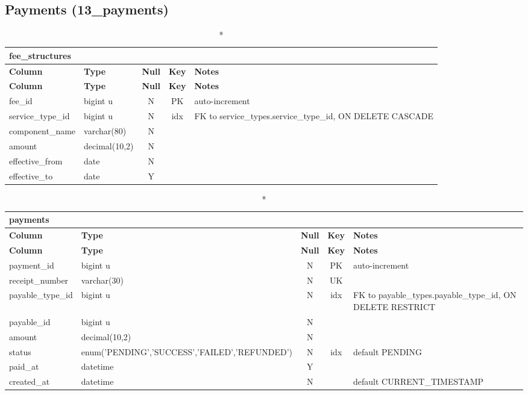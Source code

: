 \subsection*{Payments (13\_payments)}
\begin{longtable}{@{}p{3.4cm}p{2.9cm}c c p{5.6cm}@{}}
\caption*{\textbf{fee\_\allowbreak{}structures}}\\
\toprule \textbf{Column} & \textbf{Type} & \textbf{Null} & \textbf{Key} & \textbf{Notes} \\ \midrule \endfirsthead
\toprule \textbf{Column} & \textbf{Type} & \textbf{Null} & \textbf{Key} & \textbf{Notes} \\ \midrule \endhead
\bottomrule \endlastfoot
fee\_\allowbreak{}id & bigint u & N & PK & auto-increment \\
service\_\allowbreak{}type\_\allowbreak{}id & bigint u & N & idx & FK to service\_\allowbreak{}types.service\_\allowbreak{}type\_\allowbreak{}id, ON DELETE CASCADE \\
component\_\allowbreak{}name & varchar(80) & N &  &  \\
amount & decimal(10,2) & N &  &  \\
effective\_\allowbreak{}from & date & N &  &  \\
effective\_\allowbreak{}to & date & Y &  &  \\
\end{longtable}
\vspace{-0.4em}
\begin{longtable}{@{}p{3.4cm}p{2.9cm}c c p{5.6cm}@{}}
\caption*{\textbf{payments}}\\
\toprule \textbf{Column} & \textbf{Type} & \textbf{Null} & \textbf{Key} & \textbf{Notes} \\ \midrule \endfirsthead
\toprule \textbf{Column} & \textbf{Type} & \textbf{Null} & \textbf{Key} & \textbf{Notes} \\ \midrule \endhead
\bottomrule \endlastfoot
payment\_\allowbreak{}id & bigint u & N & PK & auto-increment \\
receipt\_\allowbreak{}number & varchar(30) & N & UK &  \\
payable\_\allowbreak{}type\_\allowbreak{}id & bigint u & N & idx & FK to payable\_\allowbreak{}types.payable\_\allowbreak{}type\_\allowbreak{}id, ON DELETE RESTRICT \\
payable\_\allowbreak{}id & bigint u & N &  &  \\
amount & decimal(10,2) & N &  &  \\
status & enum('PENDING',\allowbreak{}'SUCCESS',\allowbreak{}'FAILED',\allowbreak{}'REFUNDED') & N & idx & default PENDING \\
paid\_\allowbreak{}at & datetime & Y &  &  \\
created\_\allowbreak{}at & datetime & N &  & default CURRENT\_\allowbreak{}TIMESTAMP \\
\end{longtable}
